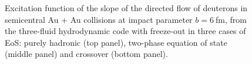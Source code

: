 \documentclass[epj]{svjour}
\begin{document}
\begin{figure}[!hb]
\caption{Excitation function of the slope of the directed flow of deuterons in semicentral Au + Au 
collisions at impact parameter $b=6~$fm, from the three-fluid hydrodynamic code 
with freeze-out in three cases of EoS: purely hadronic (top panel), two-phase equation of state (middle panel) and  crossover (bottom panel).
\label{fig:d-flow}
}
\end{figure}
\end{document}
